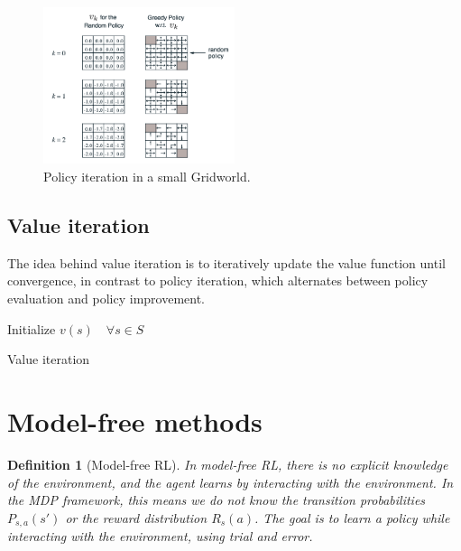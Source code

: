 \documentclass[11pt]{book} %
\newtheorem{definition}{Definition}[section]
\begin{document}
\begin{figure}
    \centering
    \includegraphics[width=0.5\textwidth]{./Figs/policy_iter.png}
    \caption{Policy iteration in a small Gridworld.}
    \label{fig:policy_iter}
\end{figure}
%
%

\subsection{Value iteration}

The idea behind value iteration is to iteratively update the value function until convergence, in contrast to policy iteration, 
which alternates between policy evaluation and policy improvement.

\begin{algorithm}[H] 
    \SetAlgoLined
    Initialize $v(s) \quad \forall s \in S$ \\
    \caption{Value iteration\label{Value iteration}}
\end{algorithm}


%
%
%
%
%
%


\section{Model-free methods}

\begin{definition}[Model-free RL]
    In model-free RL, there is no explicit knowledge of the environment, and the agent learns by interacting with the environment.
    In the MDP framework, this means we do not know the transition probabilities $P_{s,a}(s')$ or the reward distribution $R_s(a)$.
    The goal is to learn a policy while interacting with the environment, using trial and error.
\end{definition}
\end{document}
